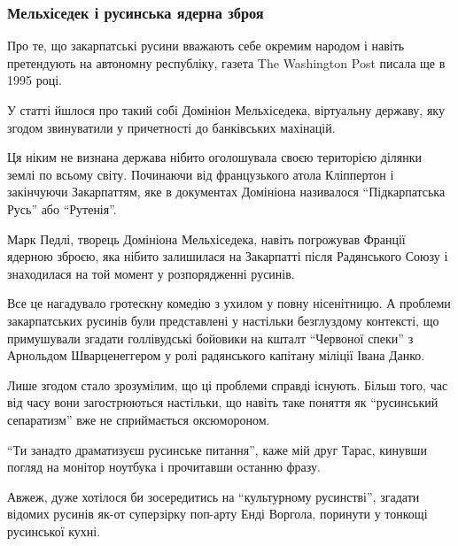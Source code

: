  
 
 

\subsubsection{Мельхіседек і русинська ядерна зброя}
\label{sec:11_11_2020.news.ua.pravda.1.rusynstvo.melhisedek_rusyn_zbroja}

Про те, що закарпатські русини вважають себе окремим народом і навіть
претендують на автономну республіку, газета The Washington Post писала ще в
1995 році.

У статті йшлося про такий собі Домініон Мельхіседека, віртуальну державу, яку
згодом звинуватили у причетності до банківських махінацій.

Ця ніким не визнана держава нібито оголошувала своєю територією ділянки землі
по всьому світу. Починаючи від французького атола Кліппертон і закінчуючи
Закарпаттям, яке в документах Домініона називалося \enquote{Підкарпатська Русь} або
\enquote{Рутенія}.

Марк Педлі, творець Домініона Мельхіседека, навіть погрожував Франції ядерною
зброєю, яка нібито залишилася на Закарпатті після Радянського Союзу і
знаходилася на той момент у розпорядженні русинів.

Все це нагадувало гротескну комедію з ухилом у повну нісенітницю. А проблеми
закарпатських русинів були представлені у настільки безглуздому контексті, що
примушували згадати голлівудські бойовики на кшталт \enquote{Червоної спеки} з
Арнольдом Шварценеггером у ролі радянського капітану міліції Івана Данко. 

Лише згодом стало зрозумілим, що ці проблеми справді існують. Більш того, час
від часу вони загострюються настільки, що навіть таке поняття як \enquote{русинський
сепаратизм} вже не сприймається оксюмороном.

\enquote{Ти занадто драматизуєш русинське питання}, \dshM каже мій друг Тарас, кинувши
погляд на монітор ноутбука і прочитавши останню фразу.

Авжеж, дуже хотілося би зосередитись на \enquote{культурному русинстві}, згадати
відомих русинів як-от суперзірку поп-арту Енді Воргола, поринути у тонкощі
русинської кухні.

